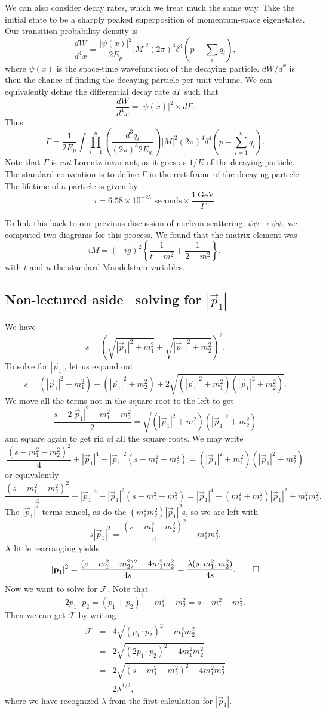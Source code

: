 We can also consider decay rates, which we treat much the same way. Take the initial state to be a sharply peaked superposition of momentum-space eigenstates. Our transition probability density is
$$\frac{dW}{d^4x}=\frac{|\psi(x)|^2}{2E_p} |M|^2(2\pi)^4\delta^4(p-\sum_i q_i),$$
where $\psi(x)$ is the space-time wavefunction of the decaying particle. $dW/d^x$ is then the chance of finding the decaying particle per unit volume. We can equivalently define the differential decay rate $d\Gamma$ such that
$$\frac{dW}{d^4x}=|\psi(x)|^2 \times d\Gamma.$$
Thus
$$\Gamma=\frac{1}{2E_p}\int \prod_{i=1}^n \left(\frac{d^3 q_i}{(2\pi)^3 2E_{q_i}}\right)|M|^2(2\pi)^4 \delta^4(p-\sum_{i=1}^n q_i).$$
Note that $\Gamma$ is \emph{not} Lorentz invariant, as it goes as $1/E$ of the decaying particle. The standard convention is to define $\Gamma$ in the rest frame of the decaying particle. The lifetime of a particle is given by 
$$\tau=6.58\times 10^{-25}\text{ seconds}\times \frac{\SI{1}{\giga\electronvolt}}{\Gamma}.$$

To link this back to our previous discussion of nucleon scattering, $\psi\psi \to \psi\psi$, we computed two diagrams for this process. We found that the matrix element was
$$iM=(-ig)^2\left\{\frac{1}{t-m^2}+\frac{1}{2-m^2}\right\},$$
with $t$ and $u$ the standard Mandelstam variables. 

\subsection*{Non-lectured aside-- solving for $|\vec p_1|$} We have 
$$s=\left(\sqrt{|\vec p_1|^2+m_1^2}+\sqrt{|\vec p_1|^2+m_2^2}\right)^2.$$
To solve for $|\vec p_1|$, let us expand out 
$$s=(|\vec p_1|^2+m_1^2)+(|\vec p_1|^2+m_2^2)+2\sqrt{(|\vec p_1|^2+m_1^2)(|\vec p_1|^2+m_2^2)}.$$
We move all the terms not in the square root to the left to get
$$\frac{s-2|\vec p_1|^2-m_1^2-m_2^2}{2}=\sqrt{(|\vec p_1|^2+m_1^2)(|\vec p_1|^2+m_2^2)}$$
and square again to get rid of all the square roots. We may write
$$\frac{(s-m_1^2-m_2^2)^2}{4}+|\vec p_1|^4 -|\vec p_1|^2(s-m_1^2-m_2^2)=(|\vec p_1|^2+m_1^2)(|\vec p_1|^2+m_2^2)$$
or equivalently
$$\frac{(s-m_1^2-m_2^2)^2}{4}+|\vec p_1|^4 -|\vec p_1|^2(s-m_1^2-m_2^2)=|\vec p_1|^4 +(m_1^2+m_2^2)|\vec p_1|^2 +m_1^2m_2^2.$$
The $|\vec p_1|^4$ terms cancel, as do the $(m_1^2m_2^2)|\vec p_1|^2$s, so we are left with
$$s|\vec p_1|^2 =\frac{(s-m_1^2-m_2^2)^2}{4}-m_1^2m_2^2.$$
A little rearranging yields
$$|\vec p_1|^2 =\frac{(s-m_1^2-m_2^2)^2-4m_1^2 m_2^2}{4s}=\frac{\lambda(s,m_1^2,m_2^2)}{4s}.\qed$$
Now we want to solve for $\mathcal{F}$. Note that
$$2p_1\cdot p_2 = (p_1+p_2)^2-m_1^2-m_2^2=s-m_1^2-m_2^2.$$
Then we can get $\mathcal{F}$ by writing
\begin{eqnarray*}
\mathcal{F}&=&4\sqrt{(p_1\cdot p_2)^2-m_1^2m_2^2}\\
&=&2\sqrt{(2p_1\cdot p_2)^2-4m_1^2m_2^2}\\
&=&2\sqrt{(s-m_1^2-m_2^2)^2-4m_1^2m_2^2}\\
&=&2\lambda^{1/2},
\end{eqnarray*}
where we have recognized $\lambda$ from the first calculation for $|\vec p_1|.$